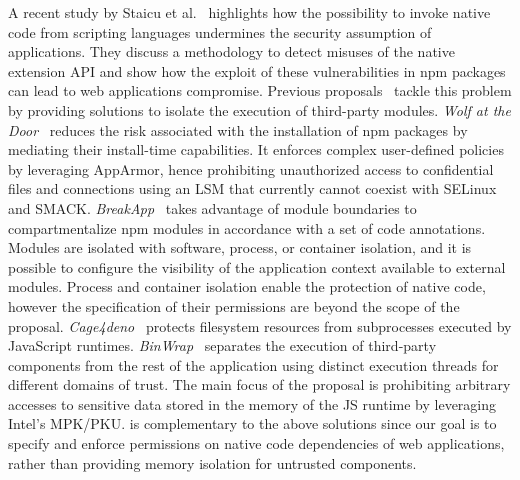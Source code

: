 A recent study by Staicu et al.~\cite{staicu2021bilingual} highlights
how the possibility to invoke native code from scripting languages
undermines the security assumption of applications. They discuss a
methodology to detect misuses of the native extension API and show how
the exploit of these vulnerabilities in npm packages can lead to web
applications compromise. Previous proposals~\cite{
  vasilakis2018breakapp, wyss2022wolf, binwrap} tackle this problem by
providing solutions to isolate the execution of third-party
modules. {\em Wolf at the Door}~\cite{wyss2022wolf} reduces the risk
associated with the installation of npm packages by mediating their
install-time capabilities. It enforces complex user-defined policies
by leveraging AppArmor, hence prohibiting unauthorized access to
confidential files and connections using an LSM that currently cannot
coexist with SELinux and SMACK. {\em BreakApp}~\cite{
  vasilakis2018breakapp} takes advantage of module boundaries to
compartmentalize npm modules in accordance with a set of code
annotations. Modules are isolated with software, process, or container
isolation, and it is possible to configure the visibility of the
application context available to external modules. Process and
container isolation enable the protection of native code, however the
specification of their permissions are beyond the scope of the
proposal.
{\em Cage4deno}~\cite{cage4deno} protects filesystem resources from subprocesses
executed by JavaScript runtimes.
{\em BinWrap}~\cite{binwrap} separates the execution of
third-party components from the rest of the application using distinct
execution threads for different domains of trust. The main focus
of the proposal is prohibiting arbitrary accesses to sensitive data
stored in the memory of the JS runtime by leveraging Intel's MPK/PKU.
\natisand is complementary to the above solutions since our goal
is to specify and enforce permissions on native code dependencies of
web applications, rather than providing memory isolation for
untrusted components.


